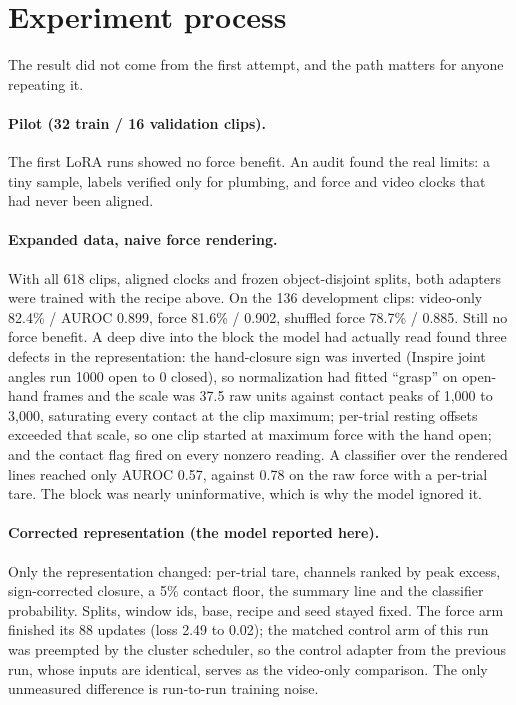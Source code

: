 \documentclass{article}
\begin{document}
\section{Experiment process}
\label{sec:process}

The result did not come from the first attempt, and the path matters for anyone repeating it.

\paragraph{Pilot (32 train / 16 validation clips).} The first LoRA runs showed no force benefit.
An audit found the real limits: a tiny sample, labels verified only for plumbing, and force and
video clocks that had never been aligned.

\paragraph{Expanded data, naive force rendering.} With all 618 clips, aligned clocks and frozen
object-disjoint splits, both adapters were trained with the recipe above. On the 136 development
clips: video-only 82.4\% / AUROC 0.899, force 81.6\% / 0.902, shuffled force 78.7\% / 0.885.
Still no force benefit. A deep dive into the block the model had actually read found three
defects in the representation: the hand-closure sign was inverted (Inspire joint angles run 1000
open to 0 closed), so normalization had fitted ``grasp'' on open-hand frames and the scale was
37.5 raw units against contact peaks of 1{,}000 to 3{,}000, saturating every contact at the clip
maximum; per-trial resting offsets exceeded that scale, so one clip started at maximum force with
the hand open; and the contact flag fired on every nonzero reading. A classifier over the
rendered lines reached only AUROC 0.57, against 0.78 on the raw force with a per-trial tare. The
block was nearly uninformative, which is why the model ignored it.

\paragraph{Corrected representation (the model reported here).} Only the representation changed:
per-trial tare, channels ranked by peak excess, sign-corrected closure, a 5\% contact floor, the
summary line and the classifier probability. Splits, window ids, base, recipe and seed stayed
fixed. The force arm finished its 88 updates (loss 2.49 to 0.02); the matched control arm of this
run was preempted by the cluster scheduler, so the control adapter from the previous run, whose
inputs are identical, serves as the video-only comparison. The only unmeasured difference is
run-to-run training noise.
\end{document}
